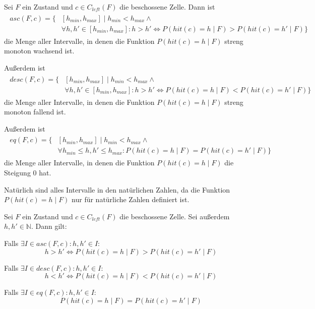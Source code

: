 \documentclass[a4paper,12pt]{llncs}
\newcommand{\N}{{\mathbb{N}}}
\numberwithin{equation}{section}
\begin{document}
\begin{definition}
Sei $F$ ein Zustand und $c \in C_{left}(F)$ die beschossene Zelle.
Dann ist
\begin{align}
\begin{split}
asc(F, c)=\{&[h_{min}, h_{max}] \mid h_{min} < h_{max} \wedge \\ 
&\forall h,h' \in [h_{min}, h_{max}]  \colon h > h' \Leftrightarrow P(hit(c)=h \mid F) > P(hit(c)=h' \mid F)\}
\nonumber
\end{split}
\end{align}
die Menge aller Intervalle, in denen die Funktion $P(hit(c)=h \mid F)$ streng monoton wachsend ist.

Außerdem ist
\begin{align}
\begin{split}
desc(F, c)=\{&[h_{min}, h_{max}] \mid h_{min} < h_{max} \wedge \\ 
&\forall h,h' \in [h_{min}, h_{max}]  \colon h > h' \Leftrightarrow P(hit(c)=h \mid F) < P(hit(c)=h' \mid F)\}
\nonumber
\end{split}
\end{align}
die Menge aller Intervalle, in denen die Funktion $P(hit(c)=h \mid F)$ streng monoton fallend ist.

Außerdem ist
\begin{align}
\begin{split}
eq(F, c)=\{&[h_{min}, h_{max}] \mid h_{min} < h_{max} \wedge \\ 
&\forall h_{min} \leq h,h' \leq h_{max} \colon P(hit(c)=h \mid F) = P(hit(c)=h' \mid F)\}
\nonumber
\end{split}
\end{align}
die Menge aller Intervalle, in denen die Funktion $P(hit(c)=h \mid F)$ die Steigung 0 hat.

Natürlich sind alles Intervalle in den natürlichen Zahlen, da die Funktion $P(hit(c)=h \mid F)$ nur für natürliche Zahlen definiert ist.
\end{definition}

\begin{lemma}
Sei $F$ ein Zustand und $c \in C_{left}(F)$ die beschossene Zelle.
Sei außerdem $h,h' \in \N$.
Dann gilt:

Falls $\exists I \in asc(F, c) \colon h,h' \in I$:
\[
h > h' \Leftrightarrow P(hit(c)=h \mid F) > P(hit(c)=h' \mid F)
\]

Falls $\exists I \in desc(F, c) \colon h,h' \in I$:
\[
h < h' \Leftrightarrow P(hit(c)=h \mid F) < P(hit(c)=h' \mid F)
\]

Falls $\exists I \in eq(F, c) \colon h,h' \in I$:
\[
P(hit(c)=h \mid F) = P(hit(c)=h' \mid F)
\]

\end{lemma}
\end{document}
